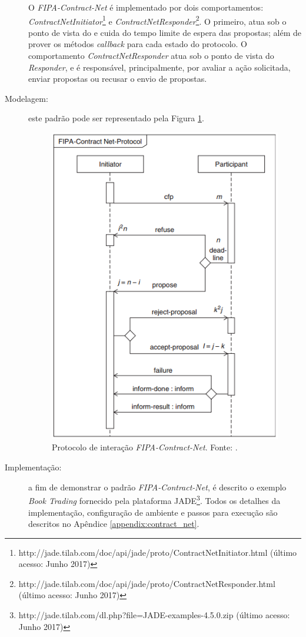 \begin{description}
O \textit{FIPA-Contract-Net} é implementado por dois comportamentos: \textit{ContractNetInitiator}\footnote{http://jade.tilab.com/doc/api/jade/proto/ContractNetInitiator.html (último acesso: Junho 2017)} e \textit{ContractNetResponder}\footnote{http://jade.tilab.com/doc/api/jade/proto/ContractNetResponder.html (último acesso: Junho 2017)}. O primeiro, atua sob o ponto de vista do \initiator e cuida do tempo limite de espera das propostas; além de prover os métodos \textit{callback} para cada estado do protocolo. O comportamento \textit{ContractNetResponder} atua sob o ponto de vista do \textit{Responder}, e é responsável, principalmente, por avaliar a ação solicitada, enviar propostas ou recusar o envio de propostas. 


\item[Modelagem:] este padrão pode ser representado pela Figura \ref{fig:protocolo_interação_contract_net}.

\begin{figure}[h!]
    \centering
    \includegraphics[scale=0.5]{figuras/contract-net-sequence_diagram.png}
    \caption{Protocolo de interação \textit{FIPA-Contract-Net}. Fonte: .}
    \label{fig:protocolo_interação_contract_net}
\end{figure}

    \item[Implementação:] a fim de demonstrar o padrão \textit{FIPA-Contract-Net}, é descrito o exemplo \textit{Book Trading} fornecido pela plataforma JADE\footnote{http://jade.tilab.com/dl.php?file=JADE-examples-4.5.0.zip (último acesso: Junho 2017)}. Todos os detalhes da implementação, configuração de ambiente e passos para execução são descritos no Apêndice \ref{appendix:contract_net}.
    
\end{description}

